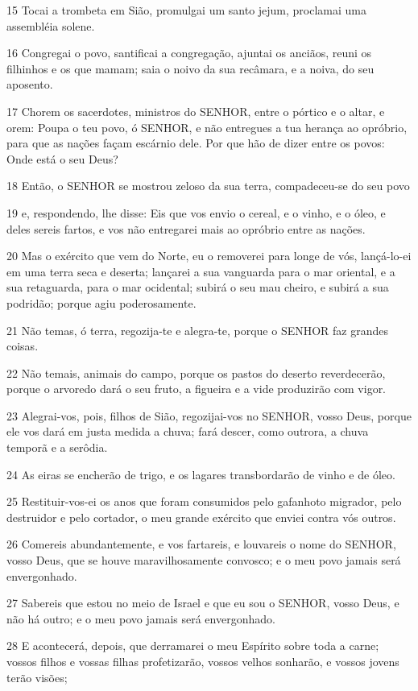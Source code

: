 \par 15 Tocai a trombeta em Sião, promulgai um santo jejum, proclamai uma assembléia solene.
\par 16 Congregai o povo, santificai a congregação, ajuntai os anciãos, reuni os filhinhos e os que mamam; saia o noivo da sua recâmara, e a noiva, do seu aposento.
\par 17 Chorem os sacerdotes, ministros do SENHOR, entre o pórtico e o altar, e orem: Poupa o teu povo, ó SENHOR, e não entregues a tua herança ao opróbrio, para que as nações façam escárnio dele. Por que hão de dizer entre os povos: Onde está o seu Deus?
\par 18 Então, o SENHOR se mostrou zeloso da sua terra, compadeceu-se do seu povo
\par 19 e, respondendo, lhe disse: Eis que vos envio o cereal, e o vinho, e o óleo, e deles sereis fartos, e vos não entregarei mais ao opróbrio entre as nações.
\par 20 Mas o exército que vem do Norte, eu o removerei para longe de vós, lançá-lo-ei em uma terra seca e deserta; lançarei a sua vanguarda para o mar oriental, e a sua retaguarda, para o mar ocidental; subirá o seu mau cheiro, e subirá a sua podridão; porque agiu poderosamente.
\par 21 Não temas, ó terra, regozija-te e alegra-te, porque o SENHOR faz grandes coisas.
\par 22 Não temais, animais do campo, porque os pastos do deserto reverdecerão, porque o arvoredo dará o seu fruto, a figueira e a vide produzirão com vigor.
\par 23 Alegrai-vos, pois, filhos de Sião, regozijai-vos no SENHOR, vosso Deus, porque ele vos dará em justa medida a chuva; fará descer, como outrora, a chuva temporã e a serôdia.
\par 24 As eiras se encherão de trigo, e os lagares transbordarão de vinho e de óleo.
\par 25 Restituir-vos-ei os anos que foram consumidos pelo gafanhoto migrador, pelo destruidor e pelo cortador, o meu grande exército que enviei contra vós outros.
\par 26 Comereis abundantemente, e vos fartareis, e louvareis o nome do SENHOR, vosso Deus, que se houve maravilhosamente convosco; e o meu povo jamais será envergonhado.
\par 27 Sabereis que estou no meio de Israel e que eu sou o SENHOR, vosso Deus, e não há outro; e o meu povo jamais será envergonhado.
\par 28 E acontecerá, depois, que derramarei o meu Espírito sobre toda a carne; vossos filhos e vossas filhas profetizarão, vossos velhos sonharão, e vossos jovens terão visões;
